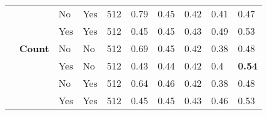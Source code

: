 \documentclass{article}
\begin{document}
\begin{table}[]
{\begin{tabular}{llllllllll}
                  &                 & No              & Yes              & 512                 & 0.79           & 0.45         & 0.42          & 0.41             & 0.47               \\
                  &                 & Yes             & Yes              & 512                 & 0.45           & 0.45         & 0.43          & 0.49             & 0.53               \\
                  & \textbf{Count}           & No              & No               & 512                 & 0.69           & 0.45         & 0.42          & 0.38             & 0.48               \\
                  &                 & Yes             & No               & 512                 & 0.43           & 0.44         & 0.42          & 0.4              & \textbf{0.54}      \\
                  &                 & No              & Yes              & 512                 & 0.64           & 0.46         & 0.42          & 0.38             & 0.48               \\
                  &                 & Yes             & Yes              & 512                 & 0.45           & 0.45         & 0.43          & 0.46             & 0.53               \\ \hline
\end{tabular}%
}
\end{table}





\end{document}
